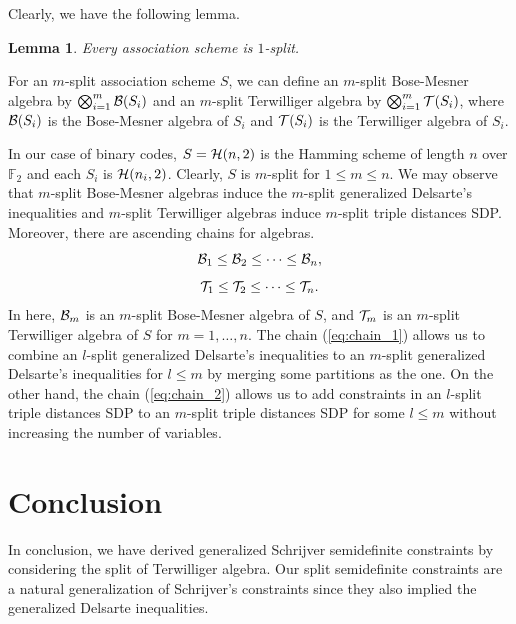 \documentclass[final,onecolumn]{IEEEtran}
\newtheorem{lemmaenv}[definitionenv]{Lemma}
\newenvironment{lemma}{\begin{lemmaenv}\rm}{\end{lemmaenv}}
\theoremstyle{definition}
\begin{document}
Clearly, we have the following lemma.
\begin{lemma}
Every association scheme is $1$-split.
\end{lemma}
	
For an  $m$-split association scheme $S$, we can define an $m$-split Bose-Mesner algebra by $\bigotimes_{i=1}^{m} {\cal B}(S_{i})$ and an $m$-split Terwilliger algebra by $\bigotimes_{i=1}^{m} {\cal T}(S_{i})$, where ${\cal B}(S_{i})$ is the Bose-Mesner algebra of $S_{i}$ and ${\cal T}(S_{i})$ is the Terwilliger algebra of $S_{i}$.

In our case of binary codes, $S = {\cal H}(n, 2)$ is the Hamming scheme of length $n$ over $\mathbb{F}_{2}$ and each $S_{i}$ is ${\cal H}(n_{i}, 2)$. Clearly, $S$ is $m$-split for $1 \leq m \leq n$. We may observe that $m$-split Bose-Mesner algebras induce the $m$-split generalized Delsarte's inequalities and $m$-split Terwilliger algebras induce $m$-split triple distances SDP. Moreover, there are ascending chains for algebras.
\begin{equation}
	\label{eq:chain_1}
	{\cal B}_{1} \leq {\cal B}_{2} \leq \cdots \leq {\cal B}_{n},
\end{equation}
\begin{equation}
	\label{eq:chain_2}
	{\cal T}_{1} \leq {\cal T}_{2} \leq \cdots \leq {\cal T}_{n}.
\end{equation}
In here, ${\cal B}_{m}$ is an $m$-split Bose-Mesner algebra of $S$, and ${\cal T}_{m}$ is an $m$-split Terwilliger algebra of $S$ for $m = 1, \dots, n$. The chain (\ref{eq:chain_1}) allows us to combine an $l$-split generalized Delsarte's inequalities to an $m$-split generalized Delsarte's inequalities for $l \leq m$ by merging some partitions as the one. On the other hand, the chain (\ref{eq:chain_2}) allows us to add constraints in an $l$-split triple distances SDP to an $m$-split triple distances SDP for some $l \leq m$ without increasing the number of variables.
	
	
\section{Conclusion}
\label{sec:conslus}
In conclusion, we have derived generalized Schrijver semidefinite constraints by considering the split of Terwilliger algebra. Our split semidefinite constraints are a natural generalization of Schrijver's constraints since they also implied the generalized Delsarte inequalities. 
	
\end{document}
